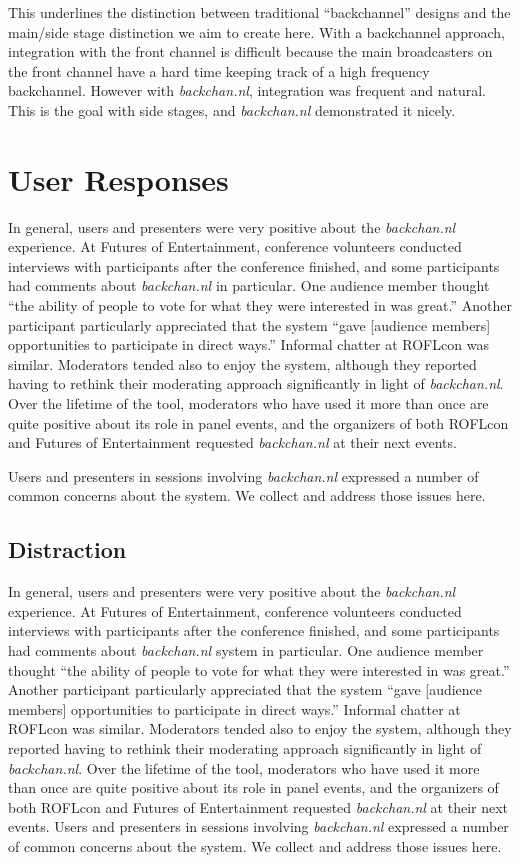 This underlines the distinction between traditional ``backchannel'' designs and the main/side stage distinction we aim to create here. With a backchannel approach, integration with the front channel is difficult because the main broadcasters on the front channel have a hard time keeping track of a high frequency backchannel. However with \emph{backchan.nl}, integration was frequent and natural. This is the goal with side stages, and \emph{backchan.nl} demonstrated it nicely.

\section{User Responses}

In general, users and presenters were very positive about the \emph{backchan.nl} experience. At Futures of Entertainment, conference volunteers conducted interviews with participants after the conference finished, and some participants had comments about \emph{backchan.nl} in particular. One audience member thought ``the ability of people to vote for what they were interested in was great.'' Another participant particularly appreciated that the system ``gave [audience members] opportunities to participate in direct ways.'' Informal chatter at ROFLcon was similar. Moderators tended also to enjoy the system, although they reported having to rethink their moderating approach significantly in light of \emph{backchan.nl}. Over the lifetime of the tool, moderators who have used it more than once are quite positive about its role in panel events, and the organizers of both ROFLcon and Futures of Entertainment requested \emph{backchan.nl} at their next events.

Users and presenters in sessions involving \emph{backchan.nl} expressed a number of common concerns about the system. We collect and address those issues here.


\subsection{Distraction}
In general, users and presenters were very positive about the \emph{backchan.nl} experience. At Futures of Entertainment, conference volunteers conducted interviews with participants after the conference finished, and some participants had comments about \emph{backchan.nl} system in particular. One audience member thought ``the ability of people to vote for what they were interested in was great.'' Another participant particularly appreciated that the system ``gave [audience members] opportunities to participate in direct ways.'' Informal chatter at ROFLcon was similar. Moderators tended also to enjoy the system, although they reported having to rethink their moderating approach significantly in light of \emph{backchan.nl}. Over the lifetime of the tool, moderators who have used it more than once are quite positive about its role in panel events, and the organizers of both ROFLcon and Futures of Entertainment requested \emph{backchan.nl} at their next events. 
Users and presenters in sessions involving \emph{backchan.nl} expressed a number of common concerns about the system. We collect and address those issues here.

